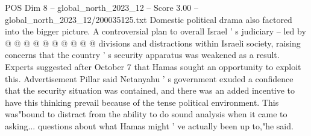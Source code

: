 \begin{textsample}{POS Dim 8 – global\_north\_2023\_12 – Score 3.00 – global\_north\_2023\_12/200035125.txt}
Domestic political drama also factored into the bigger picture.
A controversial plan to overall Israel ' s judiciary -- led by @ @ @ @ @ @ @ @ @ @ divisions and distractions within Israeli society, raising concerns that the country ' s security apparatus was weakened as a result.
Experts suggested after October 7 that Hamas sought an opportunity to exploit this.
Advertisement Pillar said Netanyahu ' s government exuded a confidence that the security situation was contained, and there was an added incentive to have this thinking prevail because of the tense political environment.
This was"bound to distract from the ability to do sound analysis when it came to asking... questions about what Hamas might ' ve actually been up to,"he said.

\end{textsample}
